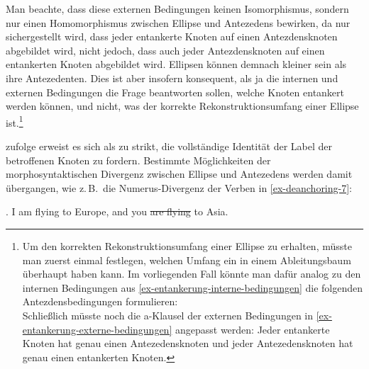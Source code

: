 \newpage
Man beachte, dass diese externen Bedingungen keinen Isomorphismus, sondern nur einen Homomorphismus zwischen Ellipse und Antezedens bewirken, da nur sichergestellt wird, dass jeder entankerte Knoten auf einen Antezdensknoten abgebildet wird, nicht jedoch, dass auch jeder Antezdensknoten auf einen entankerten Knoten abgebildet wird. Ellipsen können demnach kleiner sein als ihre Antezedenten. Dies ist aber insofern konsequent, als ja die internen und externen Bedingungen die Frage beantworten sollen, welche Knoten entankert werden können, und  nicht, was der korrekte Rekonstruktionsumfang einer Ellipse ist.\footnote{Um den korrekten Rekonstruktionsumfang einer Ellipse zu erhalten, müsste man zuerst einmal festlegen, welchen Umfang ein  in einem Ableitungsbaum überhaupt haben kann. Im vorliegenden Fall könnte man dafür analog zu den internen Bedingungen aus \ref{ex-entankerung-interne-bedingungen} die folgenden Antezdensbedingungen formulieren:\\
Schlie\ss lich müsste noch die a-Klausel der externen Bedingungen in \ref{ex-entankerung-externe-bedingungen} angepasst werden: Jeder entankerte Knoten hat genau einen Antezedensknoten und jeder Antezedensknoten hat genau einen entankerten Knoten.} 

\cite{Lichte:Kallmeyer:10} zufolge erweist es sich als zu strikt, die vollständige Identität der Label der betroffenen Knoten zu fordern. Bestimmte Möglichkeiten der morphosyntaktischen Divergenz zwischen Ellipse und Antezedens werden damit übergangen, wie z.\,B.\ die Numerus-Divergenz der Verben in \ref{ex-deanchoring-7}:  

\ex. \label{ex-deanchoring-7} I am flying to Europe, and you \sout{are flying} to Asia. \hfill \citep[(4)]{Osborne:08}


